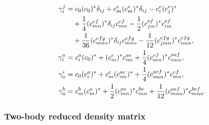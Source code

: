 \documentclass[11pt]{article}
\begin{document}
\begingroup
\small
\begin{align}
 \gamma_i^j
 &= c_0(c_0)^*\delta_{ij}
    +c_m^e(c_m^e)^*\delta_{ij}
    -c_i^e(c_j^e)^*
 \notag\\
 &\quad
    +\frac{1}{4}(c_{mn}^{ef})^*\delta_{ij}c_{mn}^{ef}
    -\frac{1}{2}(c_{jm}^{ef})^*c_{im}^{ef}
 \notag\\
 &\quad
    +\frac{1}{36}(c_{mno}^{efg})^*\delta_{ij}c_{mno}^{efg}
    -\frac{1}{12}(c_{jmn}^{efg})^*c_{imn}^{efg},
 \\
 \gamma_i^a
 &= c_i^a(c_0)^*+(c_m^e)^*c_{im}^{ae}
    +\frac{1}{4}(c_{mn}^{ef})^*c_{imn}^{aef},
 \\
 \gamma_a^i
 &= c_0(c_i^a)^*+c_m^e(c_{im}^{ae})^*
    +\frac{1}{4}(c_{imn}^{aef})^*c_{mn}^{ef},
 \\
 \gamma_a^b
 &= c_m^b(c_m^a)^*
    +\frac{1}{2}(c_{mn}^{ae})^*c_{mn}^{be}
    +\frac{1}{12}(c_{mno}^{aef})^*c_{mno}^{bef}.
\end{align}
\endgroup

\clearpage
\subsubsection{Two-body reduced density matrix}
\end{document}

